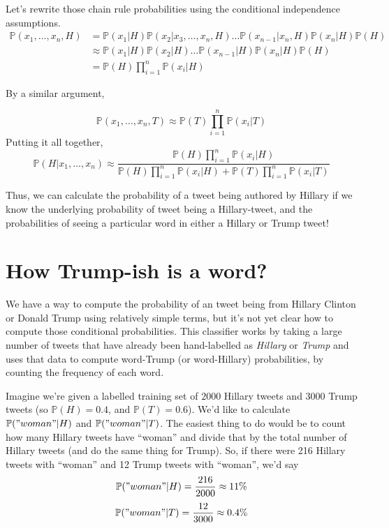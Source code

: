 \documentclass[12pt]{article} \usepackage{amsmath,amssymb,amsthm}
\begin{document}
Let's rewrite those chain rule probabilities using the conditional independence
assumptions.
\begin{equation}
\begin{split}
  \mathbb{P}(x_1, \dots, x_n, H) & = \mathbb{P}(x_1 |  H) \mathbb{P}(x_2 | x_3, \dots, x_n, H) \dots   \mathbb{P}(x_{n-1} | x_n, H) \mathbb{P}(x_n | H) \mathbb{P}(H) \\
                                 & \approx \mathbb{P}(x_1 | H) \mathbb{P}(x_2 | H) \dots   \mathbb{P}(x_{n-1} | H) \mathbb{P}(x_n | H) \mathbb{P}(H) \\
                                 & = \mathbb{P}(H)\prod_{i=1}^n \mathbb{P}(x_i | H)
\end{split}
\end{equation}

By a similar argument,

$$\mathbb{P}(x_1, \dots, x_n, T) \approx \mathbb{P}(T)\prod_{i=1}^n \mathbb{P}(x_i | T)$$
Putting it all together,
$$\mathbb{P}(H|x_1, \dots, x_n) \approx \frac{\mathbb{P}(H)\prod\limits_{i=1}^n \mathbb{P}(x_i | H)}{\mathbb{P}(H)\prod\limits_{i=1}^n \mathbb{P}(x_i | H) + \mathbb{P}(T)\prod\limits_{i=1}^n \mathbb{P}(x_i | T)}$$

Thus, we can calculate the probability of a tweet being authored by Hillary if
we know the underlying probability of tweet being a Hillary-tweet, and the
probabilities of seeing a particular word in either a Hillary or Trump tweet!

\section{How Trump-ish is a word?}
We have a way to compute the probability of an tweet being from Hillary Clinton
or Donald Trump using relatively simple terms, but it's not yet clear how to
compute those conditional probabilities. This classifier works by taking a large
number of tweets that have already been hand-labelled as \textit{Hillary} or
\textit{Trump} and uses that data to compute word-Trump (or word-Hillary)
probabilities, by counting the frequency of each word. \newline

Imagine we're given a labelled training set of $2000$ Hillary tweets and $3000$
Trump tweets (so $\mathbb{P}(H) = 0.4$, and $\mathbb{P}(T) = 0.6$). We'd like to
calculate $\mathbb{P}("woman"|H)$ and $\mathbb{P}("woman"|T)$. The easiest thing
to do would be to count how many Hillary tweets have ``woman'' and divide that by
the total number of Hillary tweets (and do the same thing for Trump). So, if
there were 216 Hillary tweets with ``woman'' and 12 Trump tweets with ``woman'',
we'd say
$$\mathbb{P}("woman"|H) = \frac{216}{2000} \approx 11\%$$
$$\mathbb{P}("woman"|T) = \frac{12}{3000} \approx 0.4\%$$
\end{document}
